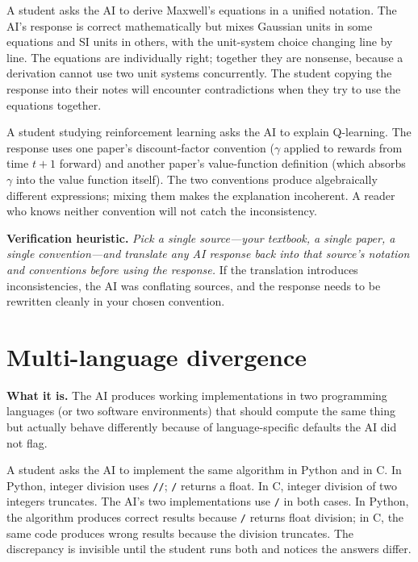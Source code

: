 \documentclass[11pt]{book}
\begin{document}
\begin{example}
A student asks the AI to derive Maxwell's equations in a unified notation. The AI's response is correct mathematically but mixes Gaussian units in some equations and SI units in others, with the unit-system choice changing line by line. The equations are individually right; together they are nonsense, because a derivation cannot use two unit systems concurrently. The student copying the response into their notes will encounter contradictions when they try to use the equations together.
\end{example}

\begin{example}
A student studying reinforcement learning asks the AI to explain Q-learning. The response uses one paper's discount-factor convention ($\gamma$ applied to rewards from time $t+1$ forward) and another paper's value-function definition (which absorbs $\gamma$ into the value function itself). The two conventions produce algebraically different expressions; mixing them makes the explanation incoherent. A reader who knows neither convention will not catch the inconsistency.
\end{example}

\textbf{Verification heuristic.} \emph{Pick a single source---your textbook, a single paper, a single convention---and translate any AI response back into that source's notation and conventions before using the response.} If the translation introduces inconsistencies, the AI was conflating sources, and the response needs to be rewritten cleanly in your chosen convention.

\section{Multi-language divergence}
\label{sec:multi-language}

\textbf{What it is.} The AI produces working implementations in two programming languages (or two software environments) that should compute the same thing but actually behave differently because of language-specific defaults the AI did not flag.

\begin{example}
A student asks the AI to implement the same algorithm in Python and in C. In Python, integer division uses \texttt{//}; \texttt{/} returns a float. In C, integer division of two integers truncates. The AI's two implementations use \texttt{/} in both cases. In Python, the algorithm produces correct results because \texttt{/} returns float division; in C, the same code produces wrong results because the division truncates. The discrepancy is invisible until the student runs both and notices the answers differ.
\end{example}
\end{document}
